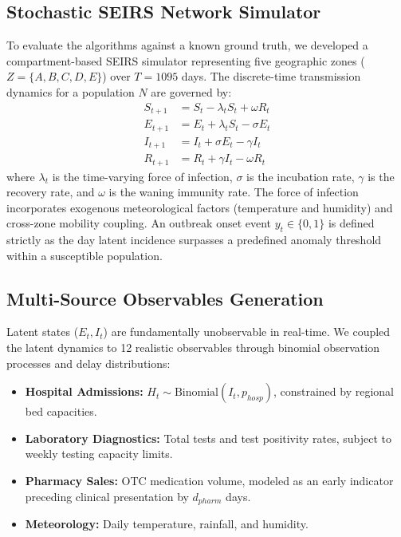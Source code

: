 \documentclass[conference]{IEEEtran}
\begin{document}
\subsection{Stochastic SEIRS Network Simulator}
To evaluate the algorithms against a known ground truth, we developed a compartment-based SEIRS simulator representing five geographic zones ($Z = \{A, B, C, D, E\}$) over $T = 1095$ days. The discrete-time transmission dynamics for a population $N$ are governed by:
\begin{align}
    S_{t+1} &= S_t - \lambda_t S_t + \omega R_t \nonumber \\
    E_{t+1} &= E_t + \lambda_t S_t - \sigma E_t \nonumber \\
    I_{t+1} &= I_t + \sigma E_t - \gamma I_t \nonumber \\
    R_{t+1} &= R_t + \gamma I_t - \omega R_t
\end{align}
where $\lambda_t$ is the time-varying force of infection, $\sigma$ is the incubation rate, $\gamma$ is the recovery rate, and $\omega$ is the waning immunity rate. The force of infection incorporates exogenous meteorological factors (temperature and humidity) and cross-zone mobility coupling. An outbreak onset event $y_t \in \{0, 1\}$ is defined strictly as the day latent incidence surpasses a predefined anomaly threshold within a susceptible population.

\subsection{Multi-Source Observables Generation}
Latent states ($E_t, I_t$) are fundamentally unobservable in real-time. We coupled the latent dynamics to 12 realistic observables through binomial observation processes and delay distributions:
\begin{itemize}
    \item \textbf{Hospital Admissions:} $H_t \sim \text{Binomial}(I_t, p_{hosp})$, constrained by regional bed capacities.
    \item \textbf{Laboratory Diagnostics:} Total tests and test positivity rates, subject to weekly testing capacity limits.
    \item \textbf{Pharmacy Sales:} OTC medication volume, modeled as an early indicator preceding clinical presentation by $d_{pharm}$ days.
    \item \textbf{Meteorology:} Daily temperature, rainfall, and humidity.
\end{itemize}
\end{document}
